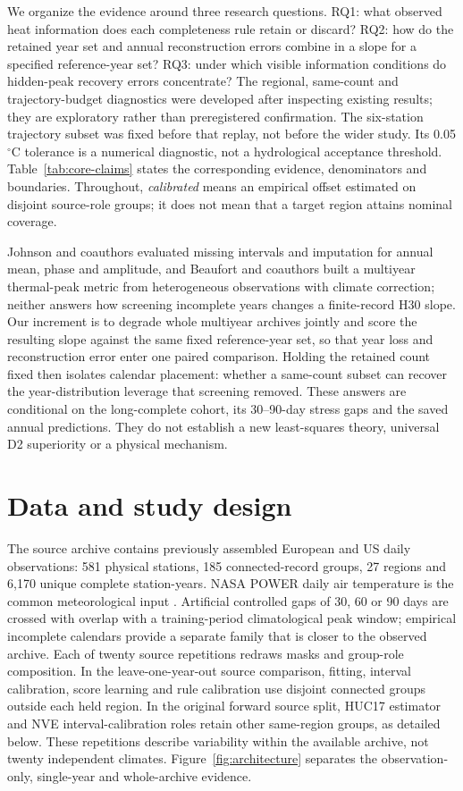 \documentclass[draft,linenumbers]{agujournal2025}
\begin{document}
We organize the evidence around three research questions. RQ1: what observed heat information does each completeness rule retain or discard? RQ2: how do the retained year set and annual reconstruction errors combine in a slope for a specified reference-year set? RQ3: under which visible information conditions do hidden-peak recovery errors concentrate? The regional, same-count and trajectory-budget diagnostics were developed after inspecting existing results; they are exploratory rather than preregistered confirmation. The six-station trajectory subset was fixed before that replay, not before the wider study. Its 0.05$^{\circ}$C tolerance is a numerical diagnostic, not a hydrological acceptance threshold. Table~\ref{tab:core-claims} states the corresponding evidence, denominators and boundaries. Throughout, \emph{calibrated} means an empirical offset estimated on disjoint source-role groups; it does not mean that a target region attains nominal coverage.

Johnson and coauthors evaluated missing intervals and imputation for annual mean, phase and amplitude, and Beaufort and coauthors built a multiyear thermal-peak metric from heterogeneous observations with climate correction; neither answers how screening incomplete years changes a finite-record H30 slope. Our increment is to degrade whole multiyear archives jointly and score the resulting slope against the same fixed reference-year set, so that year loss and reconstruction error enter one paired comparison. Holding the retained count fixed then isolates calendar placement: whether a same-count subset can recover the year-distribution leverage that screening removed. These answers are conditional on the long-complete cohort, its 30--90-day stress gaps and the saved annual predictions. They do not establish a new least-squares theory, universal D2 superiority or a physical mechanism.


\section{Data and study design}
The source archive contains previously assembled European and US daily observations: 581 physical stations, 185 connected-record groups, 27 regions and 6,170 unique complete station-years. NASA POWER daily air temperature is the common meteorological input \cite{nasapower2026}. Artificial controlled gaps of 30, 60 or 90 days are crossed with overlap with a training-period climatological peak window; empirical incomplete calendars provide a separate family that is closer to the observed archive. Each of twenty source repetitions redraws masks and group-role composition. In the leave-one-year-out source comparison, fitting, interval calibration, score learning and rule calibration use disjoint connected groups outside each held region. In the original forward source split, HUC17 estimator and NVE interval-calibration roles retain other same-region groups, as detailed below. These repetitions describe variability within the available archive, not twenty independent climates. Figure~\ref{fig:architecture} separates the observation-only, single-year and whole-archive evidence.

\end{document}
